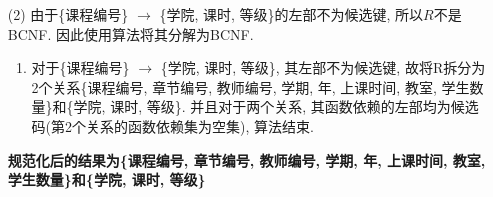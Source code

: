 \documentclass[10pt, a4paper]{article}
\begin{document}
\begin{enumerate}
\begin{enumerate}
			\item[(2)] 由于\{课程编号\} $\to$ \{学院, 课时, 等级\}的左部不为候选键, 所以$R$不是BCNF. 因此使用算法将其分解为BCNF.
			\begin{enumerate}
				\item 对于\{课程编号\} $\to$ \{学院, 课时, 等级\}, 其左部不为候选键, 故将R拆分为2个关系\{课程编号, 章节编号, 教师编号, 学期, 年, 上课时间, 教室, 学生数量\}和\{学院, 课时, 等级\}.
				并且对于两个关系, 其函数依赖的左部均为候选码(第2个关系的函数依赖集为空集), 算法结束.
			\end{enumerate} 
			\textbf{规范化后的结果为\{课程编号, 章节编号, 教师编号, 学期, 年, 上课时间, 教室, 学生数量\}和\{学院, 课时, 等级\}
}		\end{enumerate}
	\end{enumerate}
\end{document}
